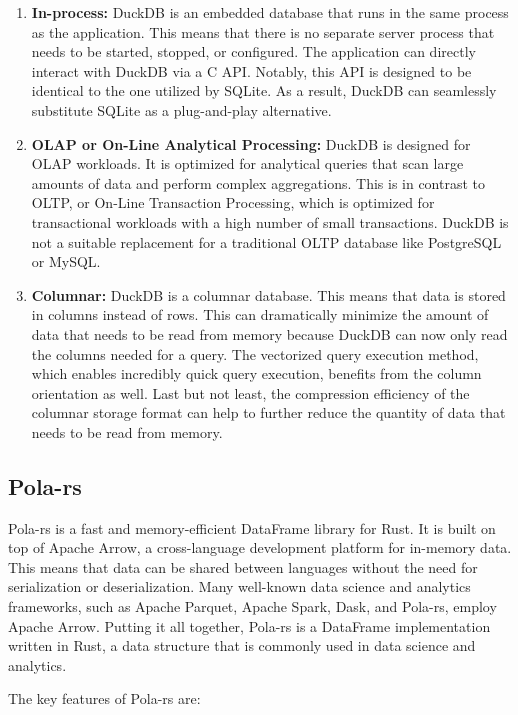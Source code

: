 \begin{enumerate}
    \itemsep0.5em
    \item \textbf{In-process:} DuckDB is an embedded database that runs in the same process as the application. This means that there is no separate server process that needs to be started, stopped, or configured. The application can directly interact with DuckDB via a C API. Notably, this API is designed to be identical to the one utilized by SQLite. As a result, DuckDB can seamlessly substitute SQLite as a plug-and-play alternative.
    \item \textbf{OLAP or On-Line Analytical Processing:} DuckDB is designed for OLAP workloads. It is optimized for analytical queries that scan large amounts of data and perform complex aggregations. This is in contrast to OLTP, or On-Line Transaction Processing, which is optimized for transactional workloads with a high number of small transactions. DuckDB is not a suitable replacement for a traditional OLTP database like PostgreSQL or MySQL.
    \item \textbf{Columnar:} DuckDB is a columnar database. This means that data is stored in columns instead of rows. This can dramatically minimize the amount of data that needs to be read from memory because DuckDB can now only read the columns needed for a query. The vectorized query execution method, which enables incredibly quick query execution, benefits from the column orientation as well. Last but not least, the compression efficiency of the columnar storage format can help to further reduce the quantity of data that needs to be read from memory.
\end{enumerate}

\subsection{Pola-rs}

Pola-rs is a fast and memory-efficient DataFrame library for Rust. It is built on top of Apache Arrow, a cross-language development platform for in-memory data. This means that data can be shared between languages without the need for serialization or deserialization. Many well-known data science and analytics frameworks, such as Apache Parquet, Apache Spark, Dask, and Pola-rs, employ Apache Arrow. Putting it all together, Pola-rs is a DataFrame implementation written in Rust, a data structure that is commonly used in data science and analytics.

The key features of Pola-rs are:

